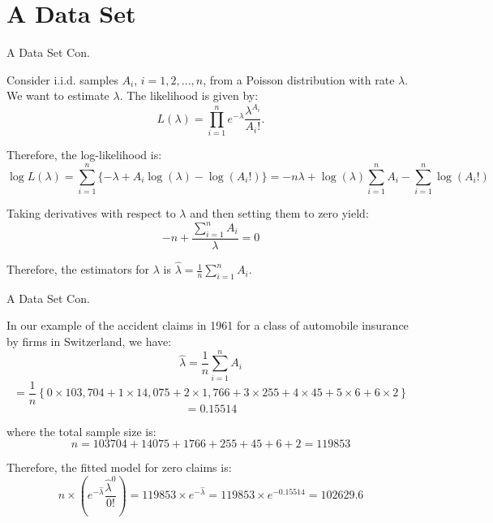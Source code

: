 \documentclass{beamer}
\begin{document}
\section{A Data Set}
\begin{frame}{A Data Set Con.}

    {\footnotesize \footnotesize
    \par  Consider i.i.d. samples $A_i$, $i=1,2,...,n$, from a Poisson distribution with rate $\lambda$. We want to estimate $\lambda$. 
    The likelihood is given by:
    \[
    L(\lambda) = \prod_{i=1}^{n} e^{-\lambda} \frac{\lambda^{A_i}}{A_i!}.
    \]
    \par  \pause Therefore, the log-likelihood is:
    \[
    \log L(\lambda) = \sum_{i=1}^{n} \{ - \lambda + A_i \log (\lambda) - \log (A_i!) \} 
    = -n \lambda + \log (\lambda) \sum_{i=1}^{n} A_i - \sum_{i=1}^{n} \log (A_i!)
    \]
    \par  \pause Taking derivatives with respect to $\lambda$ and then setting them to zero yield:
    \[
    -n + \frac{\sum_{i=1}^n A_i}{\lambda} = 0
    \]
    \par Therefore, the estimators for $\lambda$ is $\hat{\lambda} = \frac{1}{n} \sum\limits_{i=1}^n A_i.$


    }
    
\end{frame}
\begin{frame}{A Data Set Con.}

    {\footnotesize \footnotesize
    \par  In our example of the accident claims in 1961 for a class of automobile insurance by firms in Switzerland, we have:
    \[
    \hat{\lambda} = \frac{1}{n} \sum_{i=1}^n A_i
    \]
    \[
    = \frac{1}{n} \left\{ 0 \times 103,704 + 1 \times 14,075 + 2 \times 1,766 + 
    3 \times 255 + 4 \times 45 + 5 \times 6 + 6 \times 2 \right\}
    \]
    \[
    = 0.15514
    \]
    \par  \pause where the total sample size is:
    \[
    n = 103704 + 14075 + 1766 + 255 + 45 + 6 + 2 = 119853
    \]
    \par Therefore, the fitted model for zero claims is:
    \[
    n \times \left( e^{-\hat{\lambda}} \frac{\hat{\lambda}^0}{0!} \right) = 
    119853 \times e^{-\hat{\lambda}} = 119853 \times e^{-0.15514} = 102629.6
    \]

    

    }
    
\end{frame}
\end{document}
